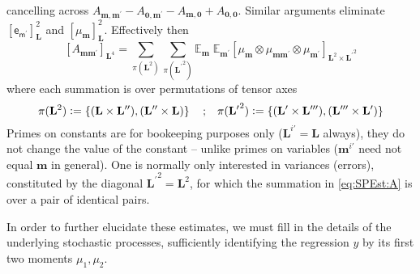 \documentclass[preprint,12pt]{elsarticle}
\newcommand*{\M}[1]{\ensuremath{#1}\xspace}
\newcommand*{\x}{\times}
\newcommand*{\mi}[1]{\mathbf{#1}}
\newcommand*{\rv}[1]{\mathsf{#1}}
\newcommand*{\te}[2][]{\left\lbrack{#2}\right\rbrack_{#1}}
\newcommand*{\deq}{\M{\mathrel{\mathop:}=}}
\newcommand{\T}[1]{\text{#1}}
\newcommand*{\QT}[2][]{\M{\quad\T{#2}\ifthenelse{\equal{#1}{}}{\quad}{#1}}}
\newcommand*{\evt}[3][]{\mathbb{E}_{#3}^{#1}\!#2}
\newcommand*{\set}[1]{\M{\left\lbrace{#1}\right\rbrace}}
\begin{document}
    cancelling across $A_{\mi{m,m^{\prime}}}-A_{\mi{0,m^{\prime}}} - A_{\mi{m,0}}+A_{\mi{0,0}}$.
    Similar arguments eliminate $\te[\mi{L}]{\rv{e_{m^{\prime}}}}^{2}$ and $\te[\mi{L}]{\mu_{\mi{m}}}^{2}$.
    Effectively then
    \begin{equation}\label{eq:SPEst:A}
        \te[\mi{L}^4]{A_{\mi{mm^{\prime}}}} = \sum_{\pi(\mi{L}^{2})} \sum_{\pi(\mi{L^{\prime}}^{2})}
        \evt{\;\evt{\te[\mi{L}^{2} \x \mi{L^{\prime}}^{2}]{\mu_{\mi{m}} \otimes \mu_{\mi{mm^{\prime}}} \otimes \mu_{\mi{m^{\prime}}}}}{\mi{m^{\prime}}}}{\mi{m}}
    \end{equation}
    where each summation is over permutations of tensor axes
    \begin{equation*}
        \pi(\mi{L}^{2}) \deq \set{(\mi{L}\x\mi{L^{\prime\prime}}), (\mi{L^{\prime\prime}}\x\mi{L})} \QT{;} \pi(\mi{L^{\prime}}^{2}) \deq \set{(\mi{L^{\prime}}\x\mi{L^{\prime\prime\prime}}), (\mi{L^{\prime\prime\prime}}\x\mi{L^{\prime}})}
    \end{equation*}
    Primes on constants are for bookeeping purposes only ($\mi{L}^{i\prime} = \mi{L}$ always), they do not change the value of the constant -- unlike primes on variables ($\mi{m}^{i\prime}$ need not equal $\mi{m}$ in general). One is normally only interested in variances (errors), constituted by the diagonal $\mi{L^{\prime}}^{2}=\mi{L}^{2}$, for which the summation in \cref{eq:SPEst:A} is over a pair of identical pairs.

    In order to further elucidate these estimates, we must fill in the details of the underlying stochastic processes, sufficiently identifying the regression $y$ by its first two moments $\mu_{1}, \mu_{2}$.
\end{document}
